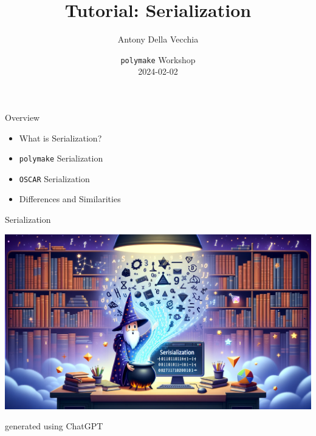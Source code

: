 \documentclass[9pt]{beamer}
\author[Antony Della Vecchia]{Antony Della Vecchia }
\title{Tutorial: Serialization}
\institute[]{
Technische Universit\"at Berlin
}
\date{
  \texttt{polymake} Workshop  \\
  2024-02-02
}
\newcommand\oscar{\texttt{OSCAR}\xspace}
\theoremstyle{definition}
\begin{document}
\maketitle

\begin{frame}[fragile]{Overview}
  \begin{itemize}
  \item What is Serialization?
  \item \texttt{polymake} Serialization
  \item \oscar Serialization
  \item Differences and Similarities
  \end{itemize}
\end{frame}



\begin{frame}[fragile]{Serialization}
  \begin{center}
    \includegraphics[height=0.7\textheight]{images/chatgpt}
    \caption{generated using ChatGPT}
  \end{center}
\end{frame}

\end{document}
